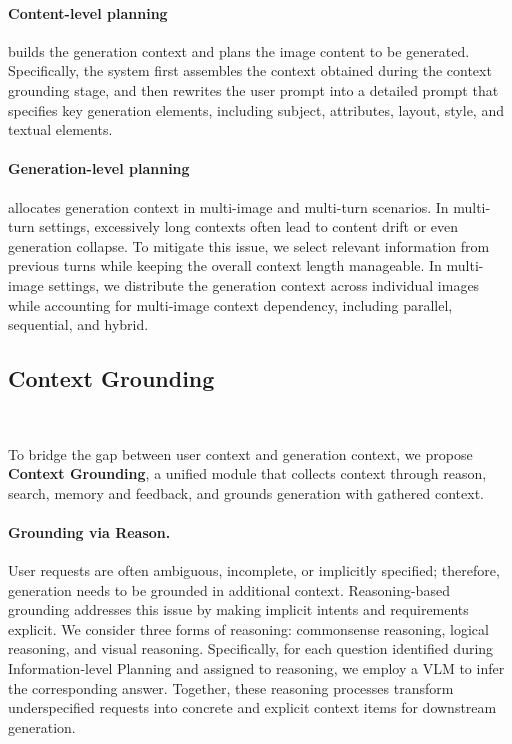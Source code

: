 \documentclass{llmxive}
\begin{document}
\paragraph{Content-level planning} builds the generation context and plans the image content to be generated. Specifically, the system first assembles the context obtained during the context grounding stage, and then rewrites the user prompt into a detailed prompt that specifies key generation elements, including subject, attributes, layout, style, and textual elements.

\paragraph{Generation-level planning} allocates generation context in multi-image and multi-turn scenarios. In multi-turn settings, excessively long contexts often lead to content drift or even generation collapse. To mitigate this issue, we select relevant information from previous turns while keeping the overall context length manageable. In multi-image settings, we distribute the generation context across individual images while accounting for multi-image context dependency, including parallel, sequential, and hybrid.

\subsection{Context Grounding}~\label{sec:context_grounding}

To bridge the gap between user context and generation context, we propose \textbf{Context Grounding}, a unified module that collects context through reason, search, memory and feedback, and grounds generation with gathered context.

\paragraph{Grounding via Reason.}
User requests are often ambiguous, incomplete, or implicitly specified; therefore, generation needs to be grounded in additional context. Reasoning-based grounding addresses this issue by making implicit intents and requirements explicit. We consider three forms of reasoning: commonsense reasoning, logical reasoning, and visual reasoning. Specifically, for each question identified during Information-level Planning and assigned to reasoning, we employ a VLM to infer the corresponding answer. Together, these reasoning processes transform underspecified requests into concrete and explicit context items for downstream generation.
\end{document}
